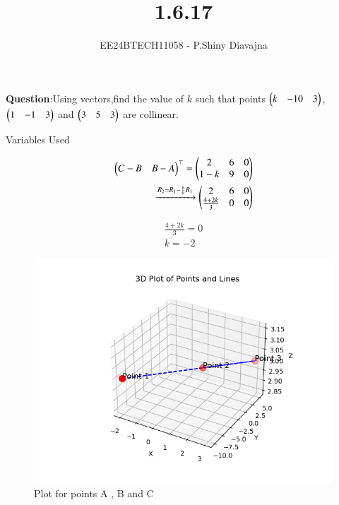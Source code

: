 \documentclass[journal]{IEEEtran}
\begin{document}

\vspace{3cm}

\title{1.6.17}
\author{EE24BTECH11058 - P.Shiny Diavajna}
{\let\newpage\relax\maketitle}

\renewcommand{\thefigure}{\theenumi}
\renewcommand{\thetable}{\theenumi}
\setlength{\intextsep}{10pt} %


\renewcommand{\thetable}{\theenumi}

\textbf{Question}:Using vectors,find the value of $k$ such that points $\begin{pmatrix}k & -10 & 3\end{pmatrix}$, $\begin{pmatrix}1 & -1 & 3\end{pmatrix}$ and $\begin{pmatrix}3 & 5 & 3\end{pmatrix}$ are collinear.\\

\solution 
    
\begin{table}[h!]    
     \centering
     
     \caption{Variables Used}
     \label{tab1.6.17.1}
   \end{table}

   \begin{align*}
     \begin{pmatrix}C-B & B-A\end{pmatrix}^\top =\begin{pmatrix}2 & 6 & 0 \\ 1-k & 9 & 0\end{pmatrix}\\
     \xrightarrow{R_2=R_1-\frac{6}{9}R_1} \begin{pmatrix}2 & 6 & 0 \\ \frac{4+2k}{3} & 0 & 0\end{pmatrix}\\ 
   \end{align*} 

   \begin{align*}
     \frac{4+2k}{3} = 0 \\
        k=-2
    \end{align*}


   \begin{figure}[h!]
    \centering
    \includegraphics[width=0.7\linewidth]{figs/Figure_2.png}
    \caption{Plot for points A , B and C}
   \end{figure}
\end{document}
